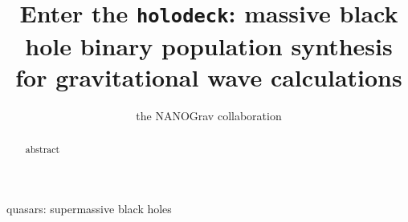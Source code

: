 %
%
%







\def\oldbibitem{} \let\oldbibitem=\bibitem
\def\bibitem{\stepcounter{citnum}\oldbibitem}

\newcommand{\orcidauthorA}{0000-0002-6625-6450} %

\title[holodeck: MBH binary populations]{Enter the \texttt{holodeck}: massive black hole binary population synthesis for gravitational wave calculations}
\author[NANOGrav]{the NANOGrav collaboration}




\maketitle

\begin{abstract}
    abstract
\end{abstract}

\begin{keywords}
    quasars: supermassive black holes
\end{keywords}


